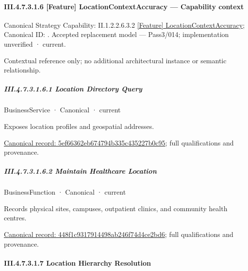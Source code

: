 \paragraph*{III.4.7.3.1.6 [Feature] LocationContextAccuracy — Capability context}
\label{navigation:III.4.7.3.1.6}

{\small Canonical Strategy Capability: II.1.2.2.6.3.2 \hyperref[element:84742d2e91364e67ac72cce991bca3a6]{[Feature] LocationContextAccuracy}; Canonical ID: \texttt{}. Accepted replacement model — Pass3/014; implementation unverified · current.}\par
Contextual reference only; no additional architectural instance or semantic relationship.\par
\subparagraph*{III.4.7.3.1.6.1 Location Directory Query}
\label{navigation:III.4.7.3.1.6.1}

\label{element:5ef66362eb674794b335c435227b0c95}
{\small BusinessService · Canonical · current}\par

Exposes location profiles and geospatial addresses.


{\footnotesize \href{../../../../../../../../continuum/business/business-service/5ef66362eb674794b335c435227b0c95.md}{Canonical record: 5ef66362eb674794b335c435227b0c95}; full qualifications and provenance.}\par
\subparagraph*{III.4.7.3.1.6.2 Maintain Healthcare Location}
\label{navigation:III.4.7.3.1.6.2}

\label{element:448f1c9317914498ab246f74d4ce2bd6}
{\small BusinessFunction · Canonical · current}\par

Records physical sites, campuses, outpatient clinics, and community health centres.


{\footnotesize \href{../../../../../../../../continuum/business/business-function/448f1c9317914498ab246f74d4ce2bd6.md}{Canonical record: 448f1c9317914498ab246f74d4ce2bd6}; full qualifications and provenance.}\par
\paragraph*{III.4.7.3.1.7 Location Hierarchy Resolution}
\label{navigation:III.4.7.3.1.7}

